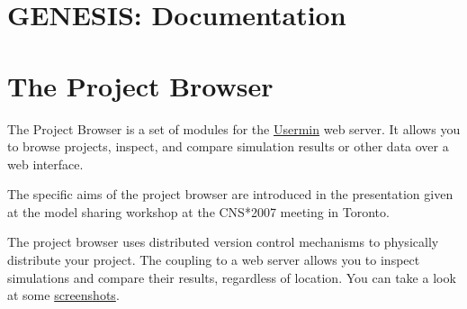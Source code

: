 \documentclass[12pt]{article}
\begin{document}
\section*{GENESIS: Documentation}

\section*{The Project Browser}

The Project Browser is a set of modules for the \href{http://www.webmin.com/usermin.html}{Usermin} web server. It allows you to browse projects, inspect, and compare simulation results or other data over a web interface.

The specific aims of the project browser are introduced in the presentation given at the model sharing workshop at the CNS*2007 meeting in Toronto.

The project browser uses distributed version control mechanisms to physically distribute your project. The coupling to a web server allows you to inspect simulations and compare their results, regardless of location. You can take a look at some \href{..document-project-browser-screenshots/document-project-browser-screenshots.pdf}{screenshots}. 
\end{document}
